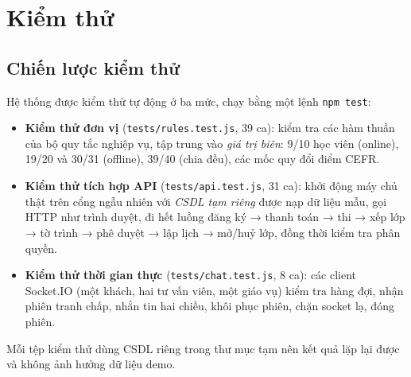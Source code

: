 \chapter{Kiểm thử}
\label{ch:test}

\section{Chiến lược kiểm thử}
Hệ thống được kiểm thử tự động ở ba mức, chạy bằng một lệnh \texttt{npm test}:
\begin{itemize}
  \item \textbf{Kiểm thử đơn vị} (\texttt{tests/rules.test.js}, 39 ca): kiểm tra các hàm thuần của bộ quy tắc nghiệp vụ, tập trung vào \emph{giá trị biên}: 9/10 học viên (online), 19/20 và 30/31 (offline), 39/40 (chia đều), các mốc quy đổi điểm CEFR.
  \item \textbf{Kiểm thử tích hợp API} (\texttt{tests/api.test.js}, 31 ca): khởi động máy chủ thật trên cổng ngẫu nhiên với \emph{CSDL tạm riêng} được nạp dữ liệu mẫu, gọi HTTP như trình duyệt, đi hết luồng đăng ký → thanh toán → thi → xếp lớp → tờ trình → phê duyệt → lập lịch → mở/huỷ lớp, đồng thời kiểm tra phân quyền.
  \item \textbf{Kiểm thử thời gian thực} (\texttt{tests/chat.test.js}, 8 ca): các client Socket.IO (một khách, hai tư vấn viên, một giáo vụ) kiểm tra hàng đợi, nhận phiên tranh chấp, nhắn tin hai chiều, khôi phục phiên, chặn socket lạ, đóng phiên.
\end{itemize}
Mỗi tệp kiểm thử dùng CSDL riêng trong thư mục tạm nên kết quả lặp lại được và không ảnh hưởng dữ liệu demo.

